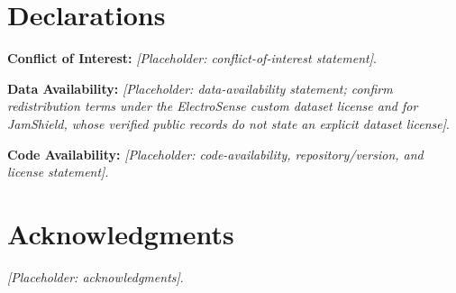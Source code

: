 \documentclass[journal]{IEEEtran}
\newcommand{\submissionplaceholder}[1]{\textit{[Placeholder: #1]}}
\begin{document}











\section*{Declarations}
\noindent\textbf{Conflict of Interest:} \submissionplaceholder{conflict-of-interest statement}.

\noindent\textbf{Data Availability:} \submissionplaceholder{data-availability statement; confirm redistribution terms under the ElectroSense custom dataset license and for JamShield, whose verified public records do not state an explicit dataset license}.

\noindent\textbf{Code Availability:} \submissionplaceholder{code-availability, repository/version, and license statement}.

\section*{Acknowledgments}
\submissionplaceholder{acknowledgments}.



\end{document}
